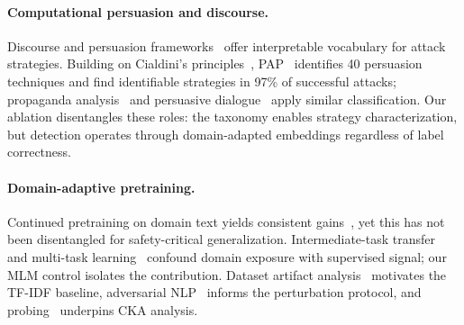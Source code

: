 \paragraph{Computational persuasion and discourse.}
Discourse and persuasion frameworks~\citep{mann1988rst,prasad2008pdtb,stolcke2000dialogueact,austin1962speechacts,searle1969speechacts} offer interpretable vocabulary for attack strategies. Building on Cialdini's principles~\citep{cialdini2001influence}, PAP~\citep{zeng2024pap} identifies 40 persuasion techniques and \citet{hagendorff2026reasoning} find identifiable strategies in 97\% of successful attacks; propaganda analysis~\citep{dasanmartino2019fine,dasanmartino2020semeval} and persuasive dialogue~\citep{wang2019persuasion} apply similar classification. Our ablation disentangles these roles: the taxonomy enables strategy characterization, but detection operates through domain-adapted embeddings regardless of label correctness.

\paragraph{Domain-adaptive pretraining.}
Continued pretraining on domain text yields consistent gains~\citep{gururangan2020dontstop,lee2020biobert,beltagy2019scibert,howard2018ulmfit}, yet this has not been disentangled for safety-critical generalization. Intermediate-task transfer~\citep{phang2018stilts} and multi-task learning~\citep{caruana1997multitask,liu2019mtdnn} confound domain exposure with supervised signal; our MLM control isolates the contribution. Dataset artifact analysis~\citep{gururangan2018artifacts,niven2019probing} motivates the TF-IDF baseline, adversarial NLP~\citep{jin2020textfooler,li2020bertattack,nasr2025attackermovessecond,andriushchenko2024adaptive} informs the perturbation protocol, and probing~\citep{conneau2018probing,hewitt2019structural} underpins CKA analysis.
